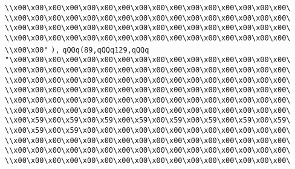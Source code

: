 \verb|\\x00\x00\x00\x00\x00\x00\x00\x00\x00\x00\x00\x00\x00\x00\x00\x00\|\newline
\verb|\\x00\x00\x00\x00\x00\x00\x00\x00\x00\x00\x00\x00\x00\x00\x00\x00\|\newline
\verb|\\x00\x00\x00\x00\x00\x00\x00\x00\x00\x00\x00\x00\x00\x00\x00\x00\|\newline
\verb|\\x00\x00\x00\x00\x00\x00\x00\x00\x00\x00\x00\x00\x00\x00\x00\x00\|\newline
\verb|\\x00\x00"|\newline
\verb|),|\newline
\verb|qQQq(89,qQQq129,qQQq|\newline
\verb|"\x00\x00\x00\x00\x00\x00\x00\x00\x00\x00\x00\x00\x00\x00\x00\x00\|\newline
\verb|\\x00\x00\x00\x00\x00\x00\x00\x00\x00\x00\x00\x00\x00\x00\x00\x00\|\newline
\verb|\\x00\x00\x00\x00\x00\x00\x00\x00\x00\x00\x00\x00\x00\x00\x00\x00\|\newline
\verb|\\x00\x00\x00\x00\x00\x00\x00\x00\x00\x00\x00\x00\x00\x00\x00\x00\|\newline
\verb|\\x00\x00\x00\x00\x00\x00\x00\x00\x00\x00\x00\x00\x00\x00\x00\x00\|\newline
\verb|\\x00\x00\x00\x00\x00\x00\x00\x00\x00\x00\x00\x00\x00\x00\x00\x00\|\newline
\verb|\\x00\x59\x00\x59\x00\x59\x00\x59\x00\x59\x00\x59\x00\x59\x00\x59\|\newline
\verb|\\x00\x59\x00\x59\x00\x00\x00\x00\x00\x00\x00\x00\x00\x00\x00\x00\|\newline
\verb|\\x00\x00\x00\x00\x00\x00\x00\x00\x00\x00\x00\x00\x00\x00\x00\x00\|\newline
\verb|\\x00\x00\x00\x00\x00\x00\x00\x00\x00\x00\x00\x00\x00\x00\x00\x00\|\newline
\verb|\\x00\x00\x00\x00\x00\x00\x00\x00\x00\x00\x00\x00\x00\x00\x00\x00\|\newline
